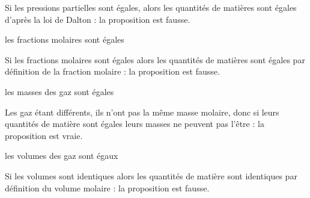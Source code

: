
\begin{corrige}
Si les pressions partielles sont égales, alors les quantités de matières sont égales d'après la loi de Dalton : la proposition est fausse. 
\end{corrige}



\begin{enonce}
les fractions molaires sont égales\fg{}
\end{enonce}


\begin{corrige}
Si les fractions molaires sont égales alors les quantités de matières sont égales par définition de la fraction molaire : la proposition est fausse. 
\end{corrige}



\begin{enonce}
les masses des gaz sont égales\fg{}
\end{enonce}


\begin{corrige}
Les gaz étant différents, ils n'ont pas la même masse molaire, donc si leurs quantités de matière sont égales leurs masses ne peuvent pas l'être : la proposition est vraie.
\end{corrige}



\begin{enonce}
les volumes des gaz sont égaux\fg{}
\end{enonce}


\begin{corrige}
Si les volumes sont identiques alors les quantités de matière sont identiques par définition du volume molaire : la proposition est fausse.
\end{corrige}

